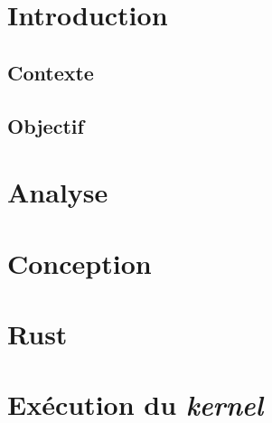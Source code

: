 \documentclass[a4paper, 12pt]{article}
\begin{document}

\section{Introduction}
\subsection{Contexte}


\subsection{Objectif}

\newpage

\section{Analyse}

\newpage

\section{Conception}


\newpage

\section{Rust}

\newpage

\section{Exécution du \textit{kernel}}

\end{document}
